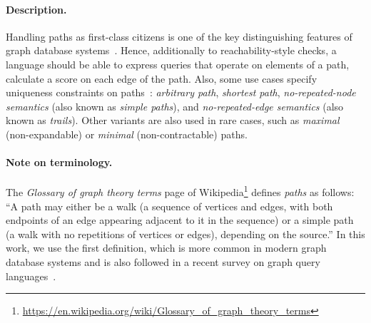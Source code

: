 
\paragraph{Description.}

Handling paths as first-class citizens is one of the key distinguishing features
of graph database systems~\cite{DBLP:conf/sigmod/AnglesABBFGLPPS18}. Hence,
additionally to reachability-style checks, a language should be able to express
queries that operate on elements of a path, \eg calculate a score on each edge
of the path. Also, some use cases specify uniqueness constraints on
paths~\cite{DBLP:journals/csur/AnglesABHRV17}: \emph{arbitrary path},
\emph{shortest path}, \emph{no-repeated-node semantics} (also known as
\emph{simple paths}), and \emph{no-repeated-edge semantics} (also known as
\emph{trails}). Other variants are also used in rare cases, such as
\emph{maximal} (non-expandable) or \emph{minimal} (non-contractable) paths.

\paragraph{Note on terminology.}

The \emph{Glossary of graph theory terms} page of
Wikipedia\footnote{\url{https://en.wikipedia.org/wiki/Glossary_of_graph_theory_terms}}
defines \emph{paths} as follows: ``A path may either be a walk (a sequence of
vertices and edges, with both endpoints of an edge appearing adjacent to it in the
sequence) or a simple path (a walk with no repetitions of vertices or edges),
depending on the source.'' In this work, we use the first definition, which is
more common in modern graph database systems and is also followed in a recent
survey on graph query languages~\cite{DBLP:journals/csur/AnglesABHRV17}.


